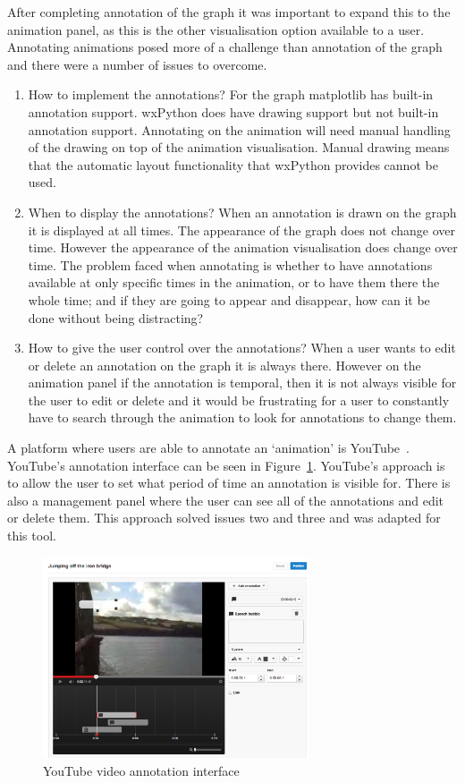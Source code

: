 After completing annotation of the graph it was important to expand this to the animation panel, as this is the other visualisation option available to a user.  Annotating animations posed more of a challenge than annotation of the graph and there were a number of issues to overcome.

\begin{enumerate}
\item How to implement the annotations?  For the graph matplotlib has built-in annotation support.  wxPython does have drawing support but not built-in annotation support.  Annotating on the animation will need manual handling of the drawing on top of the animation visualisation.  Manual drawing means that the automatic layout functionality that wxPython provides cannot be used.
\item When to display the annotations?  When an annotation is drawn on the graph it is displayed at all times.  The appearance of the graph does not change over time.  However the appearance of the animation visualisation does change over time.  The problem faced when annotating is whether to have annotations available at only specific times in the animation, or to have them there the whole time; and if they are going to appear and disappear, how can it be done without being distracting?
\item How to give the user control over the annotations? When a user wants to edit or delete an annotation on the graph it is always there.  However on the animation panel if the annotation is temporal, then it is not always visible for the user to edit or delete and it would be frustrating for a user to constantly have to search through the animation to look for annotations to change them.
\end{enumerate}

A platform where users are able to annotate an `animation' is YouTube~\cite{youtube}.  YouTube's annotation interface can be seen in Figure~\ref{fig:youtube}.  YouTube's approach is to allow the user to set what period of time an annotation is visible for.  There is also a management panel where the user can see all of the annotations and edit or delete them.  This approach solved issues two and three and was adapted for this tool.

\begin{figure}[h!]
    \centering
    \includegraphics[width=0.7\textwidth]{images/youtube.png}
    \caption{YouTube video annotation interface}
    \label{fig:youtube}
\end{figure}

